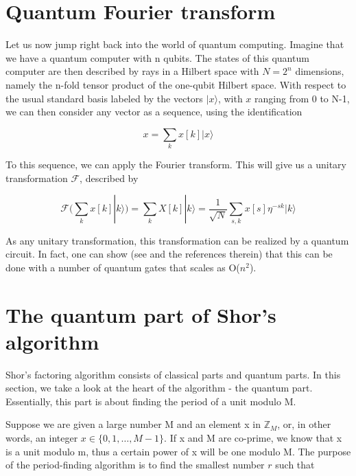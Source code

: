 \documentclass[a4paper, draft]{article}
\theoremstyle{own}
\theoremstyle{remark}
\newcommand{\Z}{\mathbb{Z}}
\begin{document}
\section{Quantum Fourier transform}

Let us now jump right back into the world of quantum computing. Imagine that we have a quantum computer with n qubits. The states of this quantum computer are then described by rays in a Hilbert space with $N=2^n$ dimensions, namely the n-fold tensor product of the one-qubit Hilbert space. With respect to the usual standard basis labeled by the vectors $|x \rangle $, with $x$ ranging from 0 to N-1, we can then consider any vector as a sequence, using the identification

$$
x = \sum_k x[k] |x \rangle
$$

To this sequence, we can apply the Fourier transform. This will give us a unitary transformation $\mathcal{F}$, described by

$$
\mathcal{F}(\sum_k x[k] |k \rangle) = \sum_k X[k] |k \rangle 
= \frac{1}{\sqrt{N}} \sum_{s,k} x[s] \eta^{-sk} |k\rangle 
$$

As any unitary transformation, this transformation can be realized by a quantum circuit. In fact, one can show (see \cite{Shor96} and the references therein) that this can be done with a number of quantum gates that scales as O($n^2$). 



\section{The quantum part of Shor's algorithm}

Shor's factoring algorithm consists of classical parts and quantum parts. In this section, we take a look at the heart of the algorithm - the quantum part. Essentially, this part is about finding the period of a unit modulo M.

Suppose we are given a large number M and an element x in $\Z_M$, or, in other words, an integer $x \in \{0, 1, \dots, M-1\}$. If x and M are co-prime, we know that x is a unit modulo m, thus a certain power of x will be one modulo M. The purpose of the period-finding algorithm is to find the smallest number $r$ such that 
\end{document}
